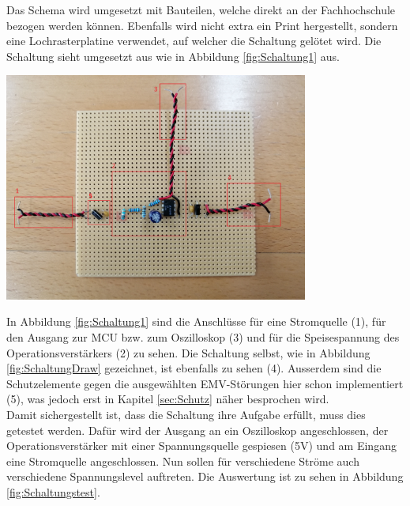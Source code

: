 Das Schema wird umgesetzt mit Bauteilen, welche direkt an der Fachhochschule bezogen werden können. Ebenfalls wird nicht extra ein Print hergestellt, sondern eine Lochrasterplatine verwendet, auf welcher die Schaltung gelötet wird. Die Schaltung sieht umgesetzt aus wie in Abbildung \ref{fig:Schaltung1} aus.

\begin{minipage}[b][6cm][t]{1\textwidth}
\centering
\includegraphics[angle=0,width=0.75\textwidth]{graphics/Schaltung1.jpg}
\label{fig:Schaltung1}
\end{minipage}
\vspace*{4cm}

In Abbildung \ref{fig:Schaltung1} sind die Anschlüsse für eine Stromquelle (1), für den Ausgang zur MCU bzw. zum Oszilloskop (3) und für die Speisespannung des Operationsverstärkers (2) zu sehen. Die Schaltung selbst, wie in Abbildung \ref{fig:SchaltungDraw} gezeichnet, ist ebenfalls zu sehen (4). Ausserdem sind die Schutzelemente gegen die ausgewählten EMV-Störungen hier schon implementiert (5), was jedoch erst in Kapitel \ref{sec:Schutz} näher besprochen wird.\\

Damit sichergestellt ist, dass die Schaltung ihre Aufgabe erfüllt, muss dies getestet werden. Dafür wird der Ausgang an ein Oszilloskop angeschlossen, der Operationsverstärker mit einer Spannungsquelle gespiesen (5V) und am Eingang eine Stromquelle angeschlossen. Nun sollen für verschiedene Ströme auch verschiedene Spannungslevel auftreten. Die Auswertung ist zu sehen in Abbildung \ref{fig:Schaltungstest}.\\

